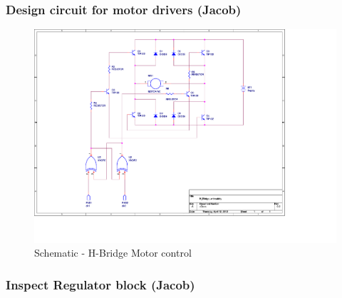 \subsubsection{Design circuit for motor drivers (Jacob)}
\begin{figure}[h!]
\hspace*{-3cm}
\centering
\includegraphics[width=13cm]{./img/SCHEMATIC1_H_Breidge}
\caption{Schematic - H-Bridge Motor control}
\label{fig:SCHEMATIC1_H_Breidge}
\end{figure}


\subsubsection{Inspect Regulator block (Jacob)}



